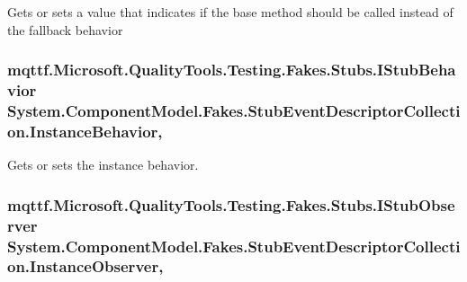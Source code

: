 Gets or sets a value that indicates if the base method should be called instead of the fallback behavior

\hypertarget{class_system_1_1_component_model_1_1_fakes_1_1_stub_event_descriptor_collection_a8f86020eee5b65cf3433d3e1717af01e}{
\subsubsection[{Instance\-Behavior}]{\setlength{\rightskip}{0pt plus 5cm}mqttf.\-Microsoft.\-Quality\-Tools.\-Testing.\-Fakes.\-Stubs.\-I\-Stub\-Behavior System.\-Component\-Model.\-Fakes.\-Stub\-Event\-Descriptor\-Collection.\-Instance\-Behavior\hspace{0.3cm}{\ttfamily [get]}, {\ttfamily [set]}}}\label{class_system_1_1_component_model_1_1_fakes_1_1_stub_event_descriptor_collection_a8f86020eee5b65cf3433d3e1717af01e}


Gets or sets the instance behavior.

\hypertarget{class_system_1_1_component_model_1_1_fakes_1_1_stub_event_descriptor_collection_af46f10e5b61ec7f9483bf61dfdc52b31}{
\subsubsection[{Instance\-Observer}]{\setlength{\rightskip}{0pt plus 5cm}mqttf.\-Microsoft.\-Quality\-Tools.\-Testing.\-Fakes.\-Stubs.\-I\-Stub\-Observer System.\-Component\-Model.\-Fakes.\-Stub\-Event\-Descriptor\-Collection.\-Instance\-Observer\hspace{0.3cm}{\ttfamily [get]}, {\ttfamily [set]}}}\label{class_system_1_1_component_model_1_1_fakes_1_1_stub_event_descriptor_collection_af46f10e5b61ec7f9483bf61dfdc52b31}


